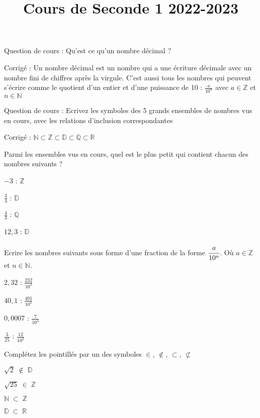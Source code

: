 \documentclass[10pt,a4paper]{exam}
\title{Cours de Seconde 1 2022-2023}
\date{}
\newcommand{\N}{\mathbb{N}}
\newcommand{\Z}{\mathbb{Z}}
\newcommand{\D}{\mathbb{D}}
\newcommand{\Q}{\mathbb{Q}}
\newcommand{\R}{\mathbb{R}}
\begin{document}
Question de cours : Qu'est ce qu'un nombre décimal ?\newline

Corrigé : Un nombre décimal est un nombre qui a une écriture décimale avec un nombre fini de chiffres après la virgule. C'est aussi tous les nombres qui peuvent s'écrire comme le quotient d'un entier et d'une puissance de 10 : $\frac{a}{10^n}$ avec $a \in \Z$ et $n \in \N$
 
Question de cours : Ecrivez les symboles des 5 grands ensembles de nombres vus en cours, avec les relations d'inclusion correspondantes\newline

Corrigé : $\N \subset \Z \subset \D \subset \Q \subset \R$

Parmi les ensembles vus en cours, quel est le plus petit qui contient chacun des nombres suivants ?
\begin{multicols}{4}
 \item $-3$ : $\Z$ 
 \item $\frac{3}{4}$ :  $\D$
 \item $\frac{4}{3}$ : $\Q$
 \item $12{,}3$ : $\D$
\end{multicols}
 
 
Ecrire les nombres suivants sous forme d'une fraction de la forme 
$\cfrac{a}{10^{n}}$. Où $a\in\Z$ et $n\in\N$.
\begin{multicols}{4}
 \item $2{,}32$ : $\frac{232}{10^2}$
 \item $40{,}1$ : $\frac{401}{10^1}$
 \item $0{,}0007$ : $\frac{7}{10^4}$
 \item $\frac{3}{25}$ : $\frac{12}{10^2}$
\end{multicols}
 


Complétez les pointillés par un des symboles $\in$, $\notin$, $\subset$, $\not\subset$
\begin{multicols}{4}
    \item $\sqrt{2}\;\notin\;\mathbb{D}$
    \item $\sqrt{25}\;\in\;\mathbb{Z}$
    \item $\mathbb{N}\;\subset\;\mathbb{Z}$
    \item $\mathbb{D}\;\subset\;\mathbb{R}$
\end{multicols}
 
 
 
\vspace{23mm}
\end{document}
